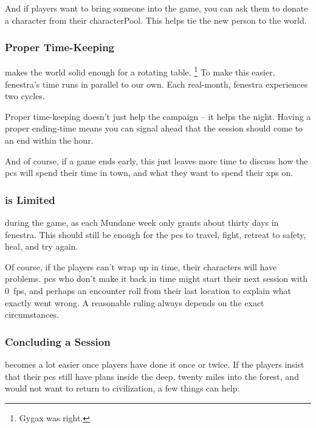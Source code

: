 \begin{multicols}{2}
And if players want to bring someone into the game, you can ask them to donate a character from their \gls{characterPool}.
This helps tie the new person to the world.

\subsubsection{Proper Time-Keeping}
makes the world solid enough for a rotating table.%
\footnote{Gygax was right.}
To make this easier, \gls{fenestra}'s time runs in parallel to our own.
Each real-month, \gls{fenestra} experiences two \glspl{cycle}.

Proper time-keeping doesn't just help the \gls{campaign} -- it helps the night.
Having a proper ending-time means you can signal ahead that the session should come to an end within the hour.

And of course, if a game ends early, this just leaves more time to discuss how the \glspl{pc} will spend their time in town, and what they want to spend their \glspl{xp} on.

\subsubsection{ is Limited}
during the game, as each Mundane week only grants about thirty days in \gls{fenestra}.
This should still be enough for the \glspl{pc} to travel, fight, retreat to safety, heal, and try again.

Of course, if the players can't wrap up in time, their characters will have problems.
\Glspl{pc} who don't make it back in time might start their next session with 0~\glspl{fp}, and perhaps an encounter roll from their last location to explain what exactly went wrong.
A reasonable ruling always depends on the exact circumstances.

\subsubsection{Concluding a Session}
becomes a lot easier once players have done it once or twice.
If the players insist that their \glspl{pc} still have plans inside the \gls{deep}, twenty miles into the forest, and would not want to return to civilization, a few things can help:


\end{multicols}
